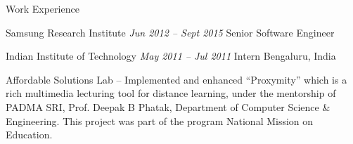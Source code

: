 \documentclass{resume} %
\begin{document}
\begin{rSection}{Work Experience}
\begin{rSubsection}{Samsung Research Institute} {\emph{Jun 2012 -- Sept 2015}} {Senior Software Engineer}
\end{rSubsection}

\begin{rSubsection}{Indian Institute of Technology} {\emph{May 2011 -- Jul 2011}} {Intern}
{Bengaluru, India}
\item Affordable Solutions Lab -- Implemented and enhanced “Proxymity” which is a rich multimedia lecturing tool for distance learning, under the mentorship of PADMA SRI, Prof. Deepak B Phatak, Department of Computer Science \& Engineering. This project was part of the program National Mission on Education.

\end{rSubsection}


\end{rSection}
\end{document}
